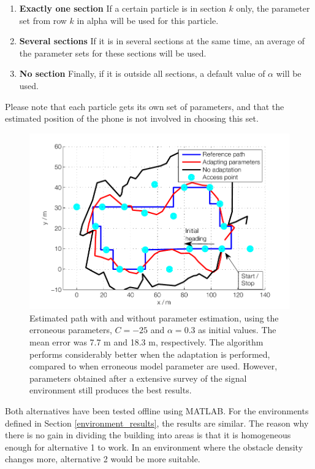 \documentclass{LTHthesis}
\begin{document}
\begin{enumerate}
\item \textbf{Exactly one section}
If a certain particle is in section $k$ only, 
the parameter set from row $k$ in alpha will be used for this particle. 

\item \textbf{Several sections}
If it is in several sections at the same time, an average of the parameter sets for these sections will be used.

\item  \textbf{No section}
Finally, if it is outside all sections, a default value of $\alpha$ will be used.
\end{enumerate}
%
Please note that each particle gets its own set of parameters, and that the estimated position of the phone is not involved in choosing this set.
%
\begin{figure}[!hbt]

\includegraphics[width=1\textwidth ]{images/adapt_parameters/adaptation_vs_none}
\caption{Estimated path with and without parameter estimation, using the erroneous parameters, $C=-25$ and $\alpha=0.3$ as initial values. The mean error was 7.7 m and 18.3 m, respectively. The algorithm performs considerably better when the adaptation is performed, compared to when erroneous model parameter are used. However, parameters obtained after a extensive survey of the signal environment still produces the best results.}
\label{adaptation_vs_none}
\end{figure}
%
Both alternatives have been tested offline using MATLAB. For the environments defined in Section \ref{environment_results}, the results are similar. The reason why there is no gain in dividing the building into areas is that it is homogeneous enough for alternative 1 to work. In an environment where the obstacle density changes more, alternative 2 would be more suitable.
\end{document}
